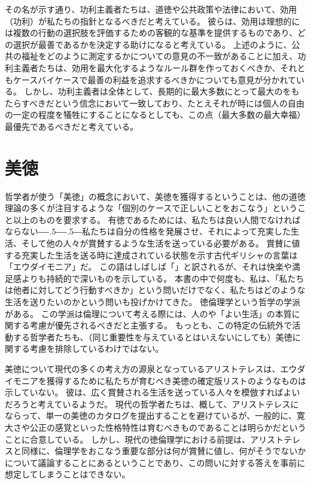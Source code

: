 \documentclass[paper=a4,book,openany]{jlreq}
\def\DDASH{―\kern-.5\zw―\kern-.5\zw―} %
\begin{document}
その名が示す通り、功利主義者たちは、道徳や公共政策や法律において、効用（功利）が私たちの指針となるべきだと考えている。
彼らは、効用は理想的には複数の行動の選択肢を評価するための客観的な基準を提供するものであり、どの選択が最善であるかを決定する助けになると考えている。
上述のように、公共の福祉をどのように測定するかについての意見の不一致があることに加え、功利主義者たちは、効用を最大化するようなルール群を作っておくべきか、それともケースバイケースで最善の利益を追求するべきかについても意見が分かれている。
しかし、功利主義者は全体として、長期的に最大多数にとって最大のをもたらすべきだという信念において一致しており、たとえそれが時には個人の自由の一定の程度を犠牲にすることになるとしても、この点（最大多数の最大幸福）最優先であるべきだと考えている。

\section{美徳}

哲学者が使う「美徳」の概念において、美徳を獲得するということは、他の道徳理論の多くが注目するような「個別のケースで正しいことをおこなう」ということ以上のものを要求する。
有徳であるためには、私たちは良い人間でなければならない{\DDASH}私たちは自分の性格を発展させ、それによって充実した生活、そして他の人々が賞賛するような生活を送っている必要がある。
賞賛に値する充実した生活を送る時に達成されている状態を示す古代ギリシャの言葉は「エウダイモニア」だ。
この語はしばしば「」と訳されるが、それは快楽や満足感よりも持続的で深いものを示している。
本書の中で何度も、私は、「私たちは他者に対してどう行動すべきか」という問いだけでなく、私たちはどのような生活を送りたいのかという問いも投げかけてきた。
徳倫理学という哲学の学派がある。
この学派は倫理について考える際には、人のや「よい生活」の本質に関する考慮が優先されるべきだと主張する。
もっとも、この特定の伝統外で活動する哲学者たちも、（同じ重要性を与えているとはいえないにしても）美徳に関する考慮を排除しているわけではない。

美徳について現代の多くの考え方の源泉となっているアリストテレスは、エウダイモニアを獲得するために私たちが育むべき美徳の確定版リストのようなものは示していない。
彼は、広く賞賛される生活を送っている人々を模倣すればよいだろうと考えているようだ。
現代の哲学者たちは、概して、アリストテレスにならって、単一の美徳のカタログを提出することを避けているが、一般的に、寛大さや公正の感覚といった性格特性は育むべきものであることは明らかだということに合意している。
しかし、現代の徳倫理学における前提は、アリストテレスと同様に、倫理学をおこなう重要な部分は何が賞賛に値し、何がそうでないかについて議論することにあるということであり、この問いに対する答えを事前に想定してしまうことはできない。
\end{document}
